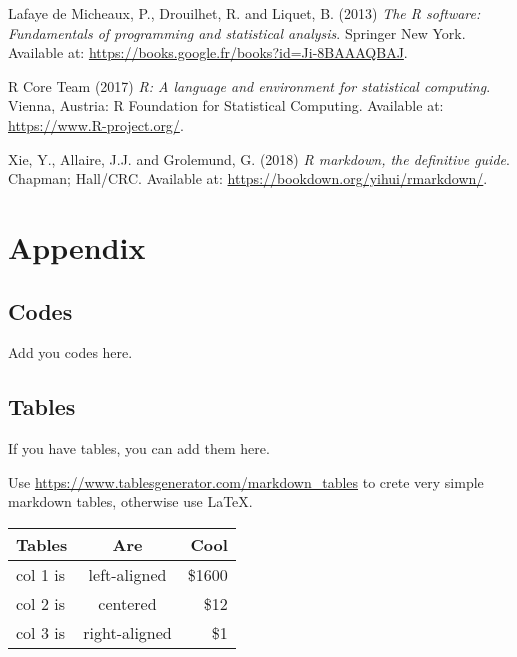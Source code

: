 \documentclass[mstat,12pt]{unswthesis}
\begin{document}
\hypertarget{refs}{}
\begin{CSLReferences}{0}{0}
\leavevmode{}%
Lafaye de Micheaux, P., Drouilhet, R. and Liquet, B. (2013) \emph{The
{R} software: Fundamentals of programming and statistical analysis}.
Springer New York. Available at:
\url{https://books.google.fr/books?id=Ji-8BAAAQBAJ}.

\leavevmode{}%
R Core Team (2017) \emph{{R}: A language and environment for statistical
computing}. Vienna, Austria: R Foundation for Statistical Computing.
Available at: \url{https://www.R-project.org/}.

\leavevmode{}%
Xie, Y., Allaire, J.J. and Grolemund, G. (2018) \emph{R markdown, the
definitive guide}. Chapman; Hall/CRC. Available at:
\url{https://bookdown.org/yihui/rmarkdown/}.

\end{CSLReferences}




\hypertarget{appendix}{%
\chapter*{Appendix}\label{appendix}}

\hypertarget{codes}{%
\section*{\texorpdfstring{\textbf{Codes}}{Codes}}\label{codes}}

Add you codes here.

\hypertarget{tables}{%
\section*{\texorpdfstring{\textbf{Tables}}{Tables}}\label{tables}}

If you have tables, you can add them here.

Use \url{https://www.tablesgenerator.com/markdown_tables} to crete very
simple markdown tables, otherwise use \LaTeX.

\begin{longtable}[]{@{}lcr@{}}
\toprule
Tables & Are & Cool \\
\midrule
\endhead
col 1 is & left-aligned & \$1600 \\
col 2 is & centered & \$12 \\
col 3 is & right-aligned & \$1 \\
\bottomrule
\end{longtable}
\end{document}
